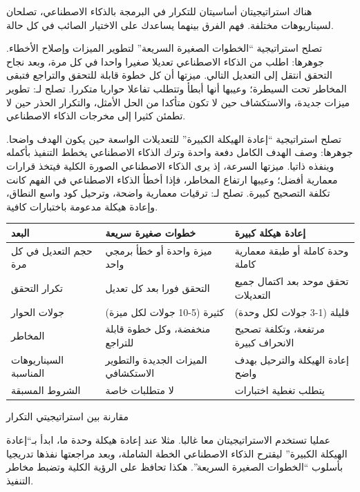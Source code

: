 هناك استراتيجيتان أساسيتان للتكرار في البرمجة بالذكاء الاصطناعي، تصلحان لسيناريوهات مختلفة. فهم الفرق بينهما يساعدك على الاختيار الصائب في كل حالة.

تصلح استراتيجية “الخطوات الصغيرة السريعة” لتطوير الميزات وإصلاح الأخطاء. جوهرها: اطلب من الذكاء الاصطناعي تعديلا صغيرا واحدا في كل مرة، وبعد نجاح التحقق انتقل إلى التعديل التالي. ميزتها أن كل خطوة قابلة للتحقق والتراجع فتبقى المخاطر تحت السيطرة؛ وعيبها أنها أبطأ وتتطلب تفاعلا حواريا متكررا. تصلح لـ: تطوير ميزات جديدة، والاستكشاف حين لا تكون متأكدا من الحل الأمثل، والتكرار الحذر حين لا تطمئن كثيرا إلى مخرجات الذكاء الاصطناعي.

تصلح استراتيجية “إعادة الهيكلة الكبيرة” للتعديلات الواسعة حين يكون الهدف واضحا. جوهرها: وصف الهدف الكامل دفعة واحدة وترك الذكاء الاصطناعي يخطط التنفيذ بأكمله وينفذه ذاتيا. ميزتها السرعة، إذ يرى الذكاء الاصطناعي الصورة الكلية فيتخذ قرارات معمارية أفضل؛ وعيبها ارتفاع المخاطر، فإذا أخطأ الذكاء الاصطناعي في الفهم كانت تكلفة التصحيح كبيرة. تصلح لـ: ترقيات معمارية واضحة، وترحيل كود واسع النطاق، وإعادة هيكلة مدعومة باختبارات كافية.

\begin{center}
\begin{tabularx}{\linewidth}{|X|X|X|}
\hline
\textbf{البعد} & \textbf{خطوات صغيرة سريعة} & \textbf{إعادة هيكلة كبيرة} \tabularnewline
\hline
حجم التعديل في كل مرة & ميزة واحدة أو خطأ برمجي واحد & وحدة كاملة أو طبقة معمارية كاملة \tabularnewline
تكرار التحقق & التحقق فورا بعد كل تعديل & تحقق موحد بعد اكتمال جميع التعديلات \tabularnewline
جولات الحوار & كثيرة (5-10 جولات لكل ميزة) & قليلة (1-3 جولات لكل وحدة) \tabularnewline
المخاطر & منخفضة، وكل خطوة قابلة للتراجع & مرتفعة، وتكلفة تصحيح الانحراف كبيرة \tabularnewline
السيناريوهات المناسبة & الميزات الجديدة والتطوير الاستكشافي & إعادة الهيكلة والترحيل بهدف واضح \tabularnewline
الشروط المسبقة & لا متطلبات خاصة & يتطلب تغطية اختبارات \tabularnewline
\hline
\end{tabularx}
\end{center}

\begin{center}\small\color{gray}مقارنة بين استراتيجيتي التكرار\end{center}

عمليا تستخدم الاستراتيجيتان معا غالبا. مثلا عند إعادة هيكلة وحدة ما، ابدأ بـ“إعادة الهيكلة الكبيرة” ليقترح الذكاء الاصطناعي الخطة الشاملة، وبعد مراجعتها نفذها تدريجيا بأسلوب “الخطوات الصغيرة السريعة”. هكذا تحافظ على الرؤية الكلية وتضبط مخاطر التنفيذ.


